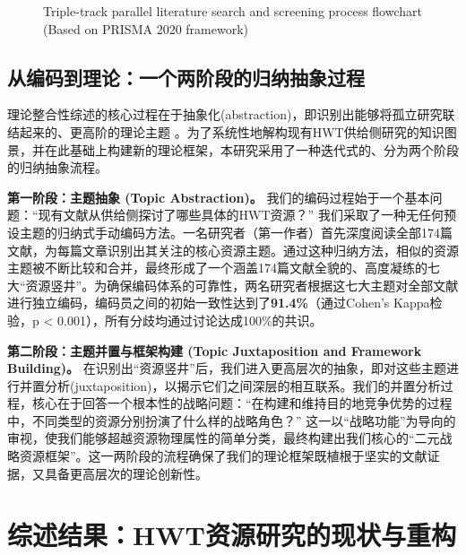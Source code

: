 \documentclass[UTF8, 12pt, a4paper, twoside]{ctexart}
\begin{document}
\begin{figure}[htbp]
	\caption{Triple-track parallel literature search and screening process flowchart (Based on PRISMA 2020 framework)}
	\label{fig:prisma}
\end{figure}

\subsection{从编码到理论：一个两阶段的归纳抽象过程}
理论整合性综述的核心过程在于抽象化(abstraction)，即识别出能够将孤立研究联结起来的、更高阶的理论主题 \parencite[cf.][]{zhong2021medical, figueiredoMappingSustainableDevelopment2024}。为了系统性地解构现有HWT供给侧研究的知识图景，并在此基础上构建新的理论框架，本研究采用了一种迭代式的、分为两个阶段的归纳抽象流程。

\textbf{第一阶段：主题抽象 (Topic Abstraction)。} 我们的编码过程始于一个基本问题：“现有文献从供给侧探讨了哪些具体的HWT资源？” 我们采取了一种无任何预设主题的归纳式手动编码方法。一名研究者（第一作者）首先深度阅读全部174篇文献，为每篇文章识别出其关注的核心资源主题。通过这种归纳方法，相似的资源主题被不断比较和合并，最终形成了一个涵盖174篇文献全貌的、高度凝练的七大“资源竖井”。为确保编码体系的可靠性，两名研究者根据这七大主题对全部文献进行独立编码，编码员之间的初始一致性达到了\textbf{91.4\%}（通过Cohen's Kappa检验，p < 0.001），所有分歧均通过讨论达成100\%的共识。

\textbf{第二阶段：主题并置与框架构建 (Topic Juxtaposition and Framework Building)。} 在识别出“资源竖井”后，我们进入更高层次的抽象，即对这些主题进行并置分析(juxtaposition)，以揭示它们之间深层的相互联系。我们的并置分析过程，核心在于回答一个根本性的战略问题：“在构建和维持目的地竞争优势的过程中，不同类型的资源分别扮演了什么样的战略角色？” 这一以“战略功能”为导向的审视，使我们能够超越资源物理属性的简单分类，最终构建出我们核心的“二元战略资源框架”。这一两阶段的流程确保了我们的理论框架既植根于坚实的文献证据，又具备更高层次的理论创新性。

\section{综述结果：HWT资源研究的现状与重构}
\end{document}
